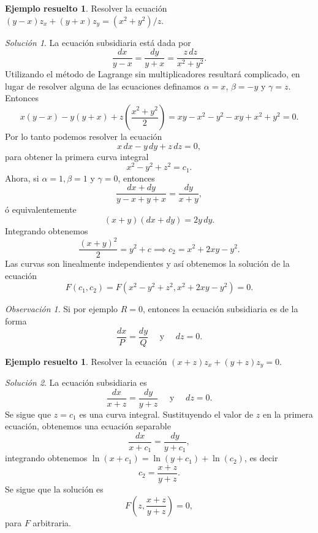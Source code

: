\documentclass[11pt,letterpaper,draft]{report}
\theoremstyle{plain}
\theoremstyle{definition}
\newtheorem{solved}[theorem]{Ejemplo resuelto}
\theoremstyle{remark}
\newtheorem{remark}[theorem]{Observación}
\newtheorem*{solution}{Solución}
\newcommand\<{\langle}
\renewcommand\>{\rangle}
\begin{document}
\begin{solved}
  Resolver la ecuación $(y-x) z_x + (y+x) z_y = (x^2+y^2) /
  z$.
  \begin{solution}
    La ecuación subsidiaria está dada por
    \[
    \frac{dx}{y-x} = \frac{dy}{y+x} = \frac{z \,
    dz}{x^2+y^2}.
    \] 
    Utilizando el método de Lagrange sin multiplicadores
    resultará complicado, en lugar de resolver alguna de las
    ecuaciones definamos $\alpha = x$, $\beta = -y$ y
    $\gamma = z$. Entonces
    \[
    x(y-x) - y(y+x) + z\left(\frac{x^2+y^2}{2}\right) = xy -
    x^2 - y^2 - xy + x^2 + y^2 = 0.
    \]
    Por lo tanto podemos resolver la ecuación
    \[
    x \, dx - y \, dy + z \, dz = 0,
    \] 
    para obtener la primera curva integral
    \[
    x^2 - y^2 + z^2 = c_1.
    \] 
    Ahora, si $\alpha = 1, \beta = 1$ y $\gamma = 0$,
    entonces
    \[
    \frac{dx + dy}{y - x + y + x} = \frac{dy}{x + y},
    \] 
    ó equivalentemente
    \[
      (x+y)(dx + dy) = 2y \, dy.
    \] 
    Integrando obtenemos
    \[
    \frac{(x+y)^2}{2} = y^2 + c \implies c_2 = x^2 + 2xy -
    y^2.
    \] 
    Las curvas son linealmente independientes y así
    obtenemos la solución de la ecuación 
    \[
    F(c_1,c_2) = F\left(x^2 - y^2 +
      z^2, x^2 + 2xy - y^2\right) = 0.
    \] 
  \end{solution}
\end{solved}

\begin{remark}
  Si por ejemplo $R = 0$, entonces la ecuación subsidiaria
  es de la forma
  \[
  \frac{dx}{P} = \frac{dy}{Q} \quad \text{ y } \quad dz = 0.
  \] 
\end{remark}

\begin{solved}
  Resolver la ecuación $(x+z) z_x + (y+z) z_y = 0$.
  \begin{solution}
    La ecuación subsidiaria es
    \[
    \frac{dx}{x+z} = \frac{dy}{y+z} \quad \text{ y } \quad
    dz = 0.
    \] 
    Se sigue que $z = c_1$ es una curva integral.
    Sustituyendo el valor de $z$ en la primera ecuación,
    obtenemos una ecuación separable
    \[
    \frac{dx}{x+c_1} = \frac{dy}{y+c_1},
    \]
    integrando obtenemos $\ln(x+c_1) = \ln(y+c_1) +
    \ln(c_2)$, es decir
    \[
    c_2 = \frac{x+z}{y+z}.
    \] 
    Se sigue que la solución es
    \[
    F\left(z, \frac{x+z}{y+z}\right) = 0,
    \] 
    para $F$ arbitraria.
  \end{solution}
\end{solved}
\end{document}
